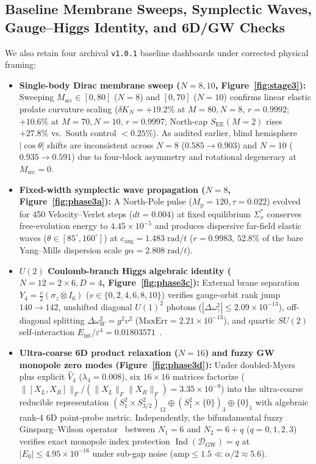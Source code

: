 \documentclass[11pt,a4paper]{article}
\begin{document}
\subsection{Baseline Membrane Sweeps, Symplectic Waves, Gauge--Higgs Identity, and 6D/GW Checks}
We also retain four archival \texttt{v1.0.1} baseline dashboards under corrected physical framing:
\begin{itemize}
  \item \textbf{Single-body Dirac membrane sweep ($N=8, 10$, Figure~\ref{fig:stage3}):} Sweeping $M_{\mathrm{src}}\in[0,80]$ ($N=8$) and $[0,70]$ ($N=10$) confirms linear elastic prolate curvature scaling ($\delta K_N = +19.2\%$ at $M=80, N=8$, $r=0.9992$; $+10.6\%$ at $M=70, N=10$, $r=0.9997$; North-cap $S_{\mathrm{EE}}(M=2)$ rises $+27.8\%$ vs.\ South control $<0.25\%$). As audited earlier, blind hemisphere $|\cos\theta|$ shifts are inconsistent across $N=8$ ($0.585\to 0.903$) and $N=10$ ($0.935\to 0.591$) due to four-block asymmetry and rotational degeneracy at $M_{\mathrm{src}}=0$.
  \item \textbf{Fixed-width symplectic wave propagation ($N=8$, Figure~\ref{fig:phase3a}):} A North-Pole pulse ($M_{\mathrm{p}}=120, \tau=0.022$) evolved for 450 Velocity--Verlet steps ($dt=0.004$) at fixed equilibrium $\Sigma_x^*$ conserves free-evolution energy to $4.45\times 10^{-5}$ and produces dispersive far-field elastic waves ($\theta\in[85^\circ,160^\circ]$) at $c_{\mathrm{ang}} = 1.483\;\mathrm{rad}/t$ ($r=0.9983$, $52.8\%$ of the bare Yang--Mills dispersion scale $g\alpha = 2.808\;\mathrm{rad}/t$).
  \item \textbf{$U(2)$ Coulomb-branch Higgs algebraic identity ($N=12=2\times 6, D=4$, Figure~\ref{fig:phase3c}):} External brane separation $Y_4 = \frac{v}{2}(\sigma_z\otimes I_6)$ ($v\in\{0,2,4,6,8,10\}$) verifies gauge-orbit rank jump $140\to 142$, unshifted diagonal $U(1)^2$ photons ($|\Delta\omega_\gamma^2|\le 2.09\times 10^{-13}$), off-diagonal splitting $\Delta\omega_W^2 = g^2 v^2$ ($\mathrm{MaxErr} = 2.21\times 10^{-13}$), and quartic $SU(2)$ self-interaction $E_{\mathrm{int}}/\varepsilon^4 = 0.01803571$~\cite{Iso2001}.
  \item \textbf{Ultra-coarse 6D product relaxation ($N=16$) and fuzzy GW monopole zero modes (Figure~\ref{fig:phase3d}):} Under doubled-Myers plus explicit $\hat{V}_4$ ($\lambda_4=0.008$), six $16\times 16$ matrices factorize ($\|[X_L,X_R]\|_F/(\|X_L\|_F\|X_R\|_F) = 3.35\times 10^{-9}$) into the ultra-coarse reducible representation $(S^2_{1}\times S^2_{3/2})_{12}\oplus(S^2_{1}\times\{0\})_3\oplus\{0\}_1$ with algebraic rank-4 6D point-probe metric. Independently, the bifundamental fuzzy Ginsparg--Wilson operator~\cite{Aoki2003,Balachandran2003} between $N_1=6$ and $N_2=6+q$ ($q=0,1,2,3$) verifies exact monopole index protection $\operatorname{Ind}(\mathcal{D}_{\mathrm{GW}})=q$ at $|E_0|\le 4.95\times 10^{-16}$ under sub-gap noise ($\mathrm{amp}\le 1.5 \ll \alpha/2 \approx 5.6$).
\end{itemize}
\end{document}

